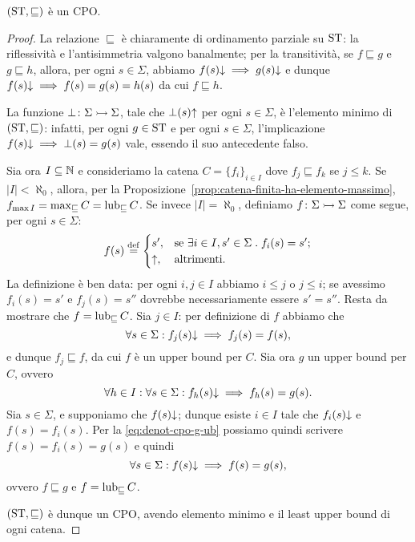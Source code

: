 \begin{proposizione}
$(\mathrm{ST}, \sqsubseteq)$ \`e un CPO.
\end{proposizione}
\begin{proof}
La relazione $\sqsubseteq$ \`e chiaramente di ordinamento parziale su $\mathrm{ST}$:
la riflessivit\`a e l'antisimmetria  valgono banalmente;
per la transitivit\`a, se $f \sqsubseteq g$ e $g \sqsubseteq h$,
allora, per ogni $s \in \Sigma$, abbiamo $f(s)\mathord{\downarrow} \implies g(s)\mathord{\downarrow}$
e dunque $f(s)\mathord{\downarrow} \implies f(s) = g(s) = h(s)$ da cui
$f \sqsubseteq h$.

La funzione $\mathord{\bot}\colon\Sigma\rightarrowtail\Sigma$, tale che $\bot(s)\mathord{\uparrow}$
per ogni $s \in \Sigma$, \`e l'elemento minimo di $(\mathrm{ST}, \sqsubseteq)$:
infatti, per ogni $g \in \mathrm{ST}$ e per ogni $s \in \Sigma$, l'implicazione
$f(s)\mathord{\downarrow} \implies \bot(s) = g(s)$ vale, essendo il suo
antecedente falso.

Sia ora $I \subseteq \mathbb{N}$ e consideriamo la catena
$C = \{f_i\}_{i \in I}$ dove $f_j \sqsubseteq f_k$ se $j \leq k$.
Se $|I| < \aleph_0$, allora,
per la Proposizione~\ref{prop:catena-finita-ha-elemento-massimo},
$f_{\max I} = \max_{\sqsubseteq} C = \mathop{\mathrm{lub}}\nolimits_{\sqsubseteq} C$.
Se invece $|I| = \aleph_0$, definiamo $\mathord{f}\colon\Sigma\rightarrowtail\Sigma$
come segue, per ogni $s \in \Sigma$:
\[
  f(s)
    \defeq
      \begin{cases}
        s', &\text{se $\exists i \in I, s' \in \Sigma \st f_i(s) = s'$;}  \\
      \divrg, &\text{altrimenti.}
    \end{cases}
\]
La definizione \`e ben data: per ogni $i, j \in I$ abbiamo $i \leq j$
o $j \leq i$;  se avessimo $f_i(s) = s'$ e $f_j(s) = s''$ dovrebbe
necessariamente essere $s' = s''$.
Resta da mostrare che $f = \mathop{\mathrm{lub}}\nolimits_{\sqsubseteq} C$.
Sia $j \in I$: per definizione di $f$ abbiamo che
\[
  \forall s \in \Sigma \mathrel{:} f_j(s)\mathord{\downarrow} \implies f_j(s) = f(s),
\]
e dunque $f_j \sqsubseteq f$, da cui $f$ \`e un upper bound per $C$.
Sia ora $g$ un upper bound per $C$, ovvero
\begin{equation}
\label{eq:denot-cpo-g-ub}
  \forall h \in I
    \mathrel{:} \forall s \in \Sigma \mathrel{:} f_h(s)\mathord{\downarrow} \implies f_h(s) = g(s).
\end{equation}
Sia $s \in \Sigma$, e supponiamo che $f(s)\mathord{\downarrow}$;
dunque esiste $i \in I$ tale che $f_i(s)\mathord{\downarrow}$ e $f(s) = f_i(s)$.
Per la \eqref{eq:denot-cpo-g-ub} possiamo quindi scrivere
$f(s) = f_i(s) = g(s)$ e quindi
\[
  \forall s \in \Sigma \mathrel{:} f(s)\mathord{\downarrow} \implies f(s) = g(s),
\]
ovvero $f \sqsubseteq g$ e $f = \mathop{\mathrm{lub}}\nolimits_{\sqsubseteq} C$.

$(\mathrm{ST}, \sqsubseteq)$ \`e dunque un CPO, avendo elemento minimo
e il least upper bound di ogni catena.
\end{proof}

